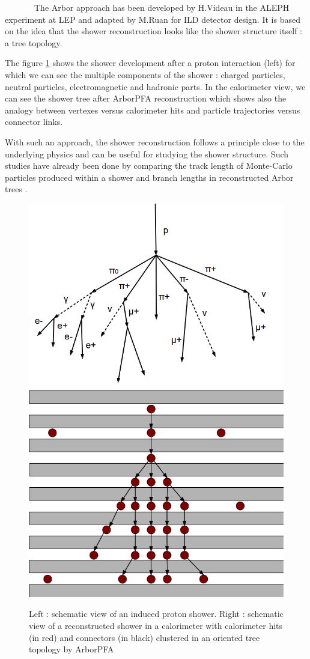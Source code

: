 \documentclass[cits]{JINST}
\begin{document}
~~~~~~~The Arbor approach has been developed by H.Videau in the ALEPH experiment at LEP and adapted by M.Ruan \cite{arbor-manqi} for ILD detector design. It is based on the idea that the shower reconstruction looks like the shower structure itself : a tree topology. 

The figure \ref{ARBOR_STRUCTURE} shows the shower development after a proton interaction (left) for which we can see the multiple components of the shower : charged particles, neutral particles, electromagnetic and hadronic parts. 
In the calorimeter view, we can see the shower tree after ArborPFA reconstruction which shows also the analogy between vertexes versus calorimeter hits and particle trajectories versus connector links.

With such an approach, the shower reconstruction follows a principle close to the underlying physics and can be useful for studying the shower structure. Such studies have already been done by comparing the track length of Monte-Carlo particles produced within a shower and branch lengths in reconstructed Arbor trees \cite{arbor-manqi}.
  
\begin{figure}[!ht]
  \begin{center}
    \includegraphics[width=0.45\linewidth]{ProtonDecay.png} \hfill
    \includegraphics[width=0.45\linewidth]{ArborSchema.png}
  \end{center}
  \caption{\label{ARBOR_STRUCTURE} Left : schematic view of an induced proton shower. Right : schematic view of a reconstructed shower in a calorimeter with calorimeter hits (in red) and connectors (in black) clustered in an oriented tree topology by ArborPFA}
\end{figure}
\end{document}
